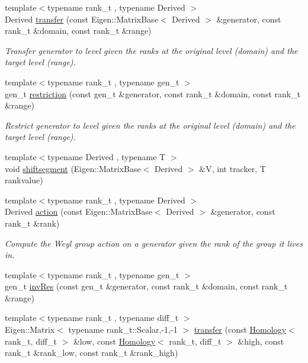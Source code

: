 \begin{DoxyCompactItemize}
{\footnotesize template$<$typename rank\+\_\+t , typename Derived $>$ }\\Derived \hyperlink{namespaceMackey_a0550bf97e47b3c319cb5e1bd81008d89}{transfer} (const Eigen\+::\+Matrix\+Base$<$ Derived $>$ \&generator, const rank\+\_\+t \&domain, const rank\+\_\+t \&range)
\begin{DoxyCompactList}\small\item\em Transfer generator to level given the ranks at the original level (domain) and the target level (range). \end{DoxyCompactList}\item 
{\footnotesize template$<$typename rank\+\_\+t , typename gen\+\_\+t $>$ }\\gen\+\_\+t \hyperlink{namespaceMackey_ad1e907ff76b07d4fc4c9d4bdf25918bd}{restriction} (const gen\+\_\+t \&generator, const rank\+\_\+t \&domain, const rank\+\_\+t \&range)
\begin{DoxyCompactList}\small\item\em Restrict generator to level given the ranks at the original level (domain) and the target level (range). \end{DoxyCompactList}\item 
{\footnotesize template$<$typename Derived , typename T $>$ }\\void \hyperlink{namespaceMackey_aab8a6292210a3b71960cb03b79d218e6}{shiftsegment} (Eigen\+::\+Matrix\+Base$<$ Derived $>$ \&V, int tracker, T rankvalue)
\item 
{\footnotesize template$<$typename rank\+\_\+t , typename Derived $>$ }\\Derived \hyperlink{namespaceMackey_aa515b26c0fbc7f19b36cee7d826f07b9}{action} (const Eigen\+::\+Matrix\+Base$<$ Derived $>$ \&generator, const rank\+\_\+t \&rank)
\begin{DoxyCompactList}\small\item\em Compute the Weyl group action on a generator given the rank of the group it lives in. \end{DoxyCompactList}\item 
{\footnotesize template$<$typename rank\+\_\+t , typename gen\+\_\+t $>$ }\\gen\+\_\+t \hyperlink{namespaceMackey_a30b5667e411ff694aa989e95e394bb41}{inv\+Res} (const gen\+\_\+t \&generator, const rank\+\_\+t \&domain, const rank\+\_\+t \&range)
\item 
{\footnotesize template$<$typename rank\+\_\+t , typename diff\+\_\+t $>$ }\\Eigen\+::\+Matrix$<$ typename rank\+\_\+t\+::\+Scalar,-\/1,-\/1 $>$ \hyperlink{namespaceMackey_a3f20cf0ccf7d280f6a6e308c381dc350}{transfer} (const \hyperlink{classMackey_1_1Homology}{Homology}$<$ rank\+\_\+t, diff\+\_\+t $>$ \&low, const \hyperlink{classMackey_1_1Homology}{Homology}$<$ rank\+\_\+t, diff\+\_\+t $>$ \&high, const rank\+\_\+t \&rank\+\_\+low, const rank\+\_\+t \&rank\+\_\+high)

\end{DoxyCompactItemize}
